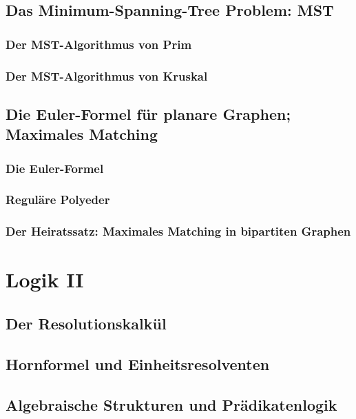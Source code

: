 \subsection{Das Minimum-Spanning-Tree Problem: MST}
\subsubsection{Der MST-Algorithmus von Prim}
\subsubsection{Der MST-Algorithmus von Kruskal}
\subsection{Die Euler-Formel für planare Graphen; Maximales Matching}
\subsubsection{Die Euler-Formel}
\subsubsection{Reguläre Polyeder}
\subsubsection{Der Heiratssatz: Maximales Matching in bipartiten Graphen}
%
%
%
\section{Logik II}
\subsection{Der Resolutionskalkül}
\subsection{Hornformel und Einheitsresolventen}
\subsection{Algebraische Strukturen und Prädikatenlogik}
